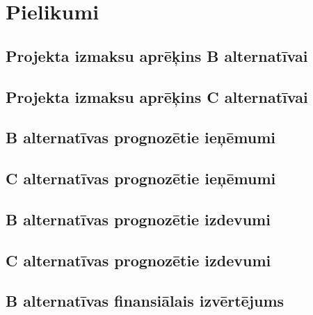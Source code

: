 \appendix
\chapter*{Pielikumi}
\renewcommand{\thesection}{\arabic{section}}
    
    
    
    
    
    
\section{Projekta izmaksu aprēķins B alternatīvai}
    \label{app:B_izmaksas}
    \begin{figure}
        \centering 
        
    \end{figure}
    \clearpage
    \begin{figure}
        \centering 
        
    \end{figure}
    \clearpage
\section{Projekta izmaksu aprēķins C alternatīvai}
	\label{app:C_izmaksas}
    \clearpage
\section{B alternatīvas prognozētie ieņēmumi}
	\label{app:B_ienemumi}
    \clearpage
\section{C alternatīvas prognozētie ieņēmumi}
	\label{app:C_ienemumi}
    \clearpage
\section{B alternatīvas prognozētie izdevumi}
	\label{app:B_izdevumi}
    \clearpage
\section{C alternatīvas prognozētie izdevumi}
	\label{app:C_izdevumi}
    \clearpage
\section{B alternatīvas finansiālais izvērtējums}
	\label{app:B_finansialais_vertejums}
    \clearpage
